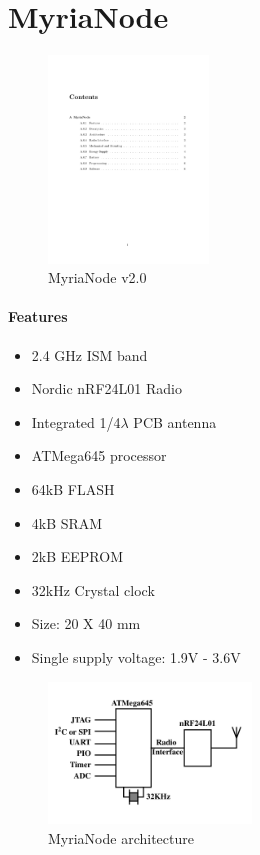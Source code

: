 \documentclass[a4paper,10pt]{report}
\begin{document}
\chapter{MyriaNode}
\begin{figure}
  \begin{center}
    \includegraphics[width=0.38\textwidth]{myrianode}
  \end{center}
  \caption{MyriaNode v2.0}
\end{figure}
\subsubsection{Features}
\begin{itemize}
 \item 2.4 GHz ISM band
 \item Nordic nRF24L01 Radio
 \item Integrated 1/4$\lambda$ PCB antenna
 \item ATMega645 processor
 \item 64kB FLASH
 \item 4kB SRAM
 \item 2kB EEPROM
 \item 32kHz Crystal clock
 \item Size: 20 X 40 mm
 \item Single supply voltage: 1.9V - 3.6V
\end{itemize}
\begin{figure}
\vspace{-50pt}
  \begin{center}
    \includegraphics[width=0.48\textwidth]{myrianodearch}
  \end{center}
  \caption{MyriaNode architecture}
  \label{myrianodearch}
\end{figure}
\end{document}
